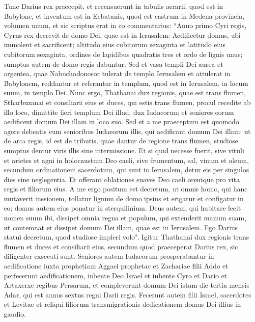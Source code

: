 \begin{biblechapter}  
\verse Tunc Darius rex praecepit, et recensuerunt in tabulis aerarii, quod est in Babylone, 
\verse et inventum est in Ecbatanis, quod est castrum in Medena provincia, volumen unum, et sic scriptus erat in eo commentarius: 
\verse “Anno primo Cyri regis, Cyrus rex decrevit de domo Dei, quae est in Ierusalem: Aedificetur domus, ubi immolent et sacrificent; altitudo eius cubitorum sexaginta et latitudo eius cubitorum sexaginta, 
\verse ordines de lapidibus quadratis tres et ordo de lignis unus; sumptus autem de domo regis dabuntur. 
\verse Sed et vasa templi Dei aurea et argentea, quae Nabuchodonosor tulerat de templo Ierusalem et attulerat in Babylonem, reddantur et referantur in templum, quod est in Ierusalem, in locum suum, in templo Dei. 
\verse Nunc ergo, Thathanai dux regionis, quae est trans flumen, Stharbuzanai et consiliarii eius et duces, qui estis trans flumen, procul recedite ab illo loco, 
\verse dimittite fieri templum Dei illud; dux Iudaeorum et seniores eorum aedificent domum Dei illam in loco suo. 
\verse Sed et a me praeceptum est quomodo agere debeatis cum senioribus Iudaeorum illis, qui aedificant domum Dei illam: ut de arca regis, id est de tributis, quae dantur de regione trans flumen, studiose sumptus dentur viris illis sine intermissione. 
\verse Et si quid necesse fuerit, sive vituli et arietes et agni in holocaustum Deo caeli, sive frumentum, sal, vinum et oleum, secundum ordinationem sacerdotum, qui sunt in Ierusalem, detur eis per singulos dies sine neglegentia. 
\verse Et offerant oblationes suaves Deo caeli orentque pro vita regis et filiorum eius. 
\verse A me ergo positum est decretum, ut omnis homo, qui hanc mutaverit iussionem, tollatur lignum de domo ipsius et erigatur et configatur in eo; domus autem eius ponatur in sterquilinium. 
\verse Deus autem, qui habitare fecit nomen suum ibi, dissipet omnia regna et populum, qui extenderit manum suam, ut contemnat et dissipet domum Dei illam, quae est in Ierusalem. Ego Darius statui decretum, quod studiose impleri volo". 
\verse Igitur Thathanai dux regionis trans flumen et duces et consiliarii eius, secundum quod praeceperat Darius rex, sic diligenter exsecuti sunt. 
\verse Seniores autem Iudaeorum prosperabantur in aedificatione iuxta prophetiam Aggaei prophetae et Zachariae filii Addo et perfecerunt aedificationem, iubente Deo Israel et iubente Cyro et Dario et Artaxerxe regibus Persarum, 
\verse et compleverunt domum Dei istam die tertia mensis Adar, qui est annus sextus regni Darii regis. 
\verse Fecerunt autem filii Israel, sacerdotes et Levitae et reliqui filiorum transmigrationis dedicationem domus Dei illius in gaudio. 

\end{biblechapter}
